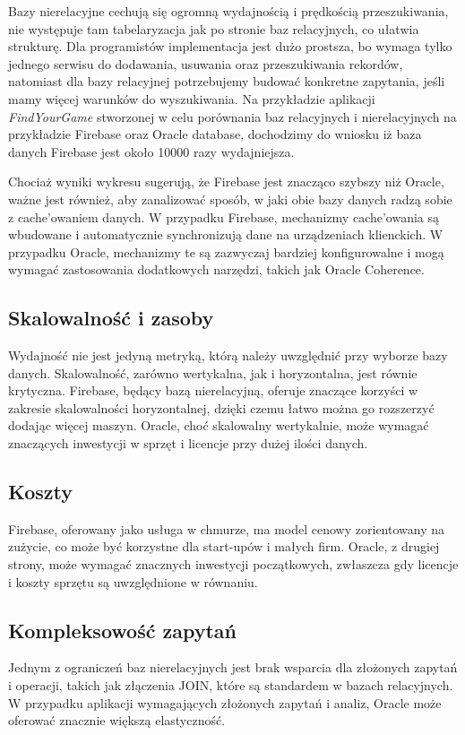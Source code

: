 Bazy nierelacyjne cechują się ogromną wydajnością i prędkością przeszukiwania, nie występuje tam tabelaryzacja jak po stronie baz relacyjnych, co ułatwia strukturę. Dla programistów implementacja jest dużo prostsza, bo wymaga tylko jednego serwisu do dodawania, usuwania oraz przeszukiwania rekordów, natomiast dla bazy relacyjnej potrzebujemy budować konkretne zapytania, jeśli mamy więcej warunków do wyszukiwania. Na przykładzie aplikacji \textit{FindYourGame} stworzonej w celu porównania baz relacyjnych i nierelacyjnych na przykładzie Firebase oraz Oracle database, dochodzimy do wniosku iż baza danych Firebase jest około 10000 razy wydajniejsza.

Chociaż wyniki wykresu sugerują, że Firebase jest znacząco szybszy niż Oracle, ważne jest również, aby zanalizować sposób, w jaki obie bazy danych radzą sobie z cache'owaniem danych. W przypadku Firebase, mechanizmy cache'owania są wbudowane i automatycznie synchronizują dane na urządzeniach klienckich. W przypadku Oracle, mechanizmy te są zazwyczaj bardziej konfigurowalne i mogą wymagać zastosowania dodatkowych narzędzi, takich jak Oracle Coherence.

\subsection{Skalowalność i zasoby}
Wydajność nie jest jedyną metryką, którą należy uwzględnić przy wyborze bazy danych. Skalowalność, zarówno wertykalna, jak i horyzontalna, jest równie krytyczna. Firebase, będący bazą nierelacyjną, oferuje znaczące korzyści w zakresie skalowalności horyzontalnej, dzięki czemu łatwo można go rozszerzyć dodając więcej maszyn. Oracle, choć skalowalny wertykalnie, może wymagać znaczących inwestycji w sprzęt i licencje przy dużej ilości danych.

\subsection{Koszty}
Firebase, oferowany jako usługa w chmurze, ma model cenowy zorientowany na zużycie, co może być korzystne dla start-upów i małych firm. Oracle, z drugiej strony, może wymagać znacznych inwestycji początkowych, zwłaszcza gdy licencje i koszty sprzętu są uwzględnione w równaniu.

\subsection{Kompleksowość zapytań}
Jednym z ograniczeń baz nierelacyjnych jest brak wsparcia dla złożonych zapytań i operacji, takich jak złączenia JOIN, które są standardem w bazach relacyjnych. W przypadku aplikacji wymagających złożonych zapytań i analiz, Oracle może oferować znacznie większą elastyczność.

